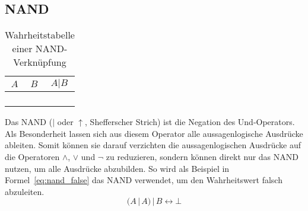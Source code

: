 \subsection{NAND}
%
\begin{table}[ht]
 \begin{center}
  \begin{tabular}{cc|c}
   \hline
    $A$ & $B$ & $A | B$ \\
   \hline \hline
    \F  & \F  & \T \\
    \F  & \T  & \T \\
    \T  & \F  & \T \\
    \T  & \T  & \F \\
  \end{tabular}
  \caption{Wahrheitstabelle einer NAND-Verknüpfung}
  \label{fig:nand_operator}
 \end{center}
\end{table}
%
Das NAND ($|$ oder $\uparrow$, Shefferscher Strich) ist die Negation des Und-Operators. Als Besonderheit lassen sich aus diesem Operator alle aussagenlogische Ausdrücke ableiten. Somit können sie darauf verzichten die aussagenlogischen Ausdrücke auf die Operatoren $\land$, $\lor$ und $\neg$ zu reduzieren, sondern können direkt nur das NAND nutzen, um alle Ausdrücke abzubilden. So wird als Beispiel in Formel~\ref{eq:nand_false} das NAND verwendet, um den Wahrheitswert falsch abzuleiten.
\begin{equation}
 \label{eq:nand_false}
  (A \,|\, A) \,|\, B \leftrightarrow \bot
\end{equation}
%
